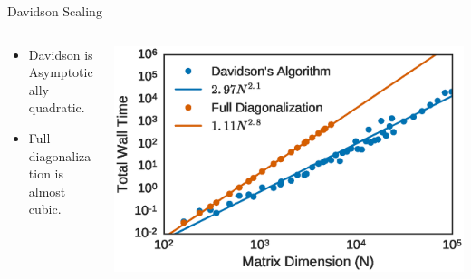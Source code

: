 \documentclass[10pt]{beamer}
\begin{document}
{{{{{{{{{{{{{\begin{frame}{Davidson Scaling}
	\begin{columns}[c] %
		\begin{column}{.4\textwidth}
			\begin{itemize}
				\item {Davidson is Asymptotically quadratic.}
				\item {Full diagonalization is almost cubic.}
			\end{itemize}				
		\end{column}
		\hfill
		\begin{column}{0.6\textwidth}
		    \begin{overprint}
			    \includegraphics[width=\linewidth]{../images/dav_vs_exact_scaling.eps}

			\end{overprint}
		\end{column}	
	\end{columns}
\end{frame}

}}}}}}}}}}}}}
\end{document}
